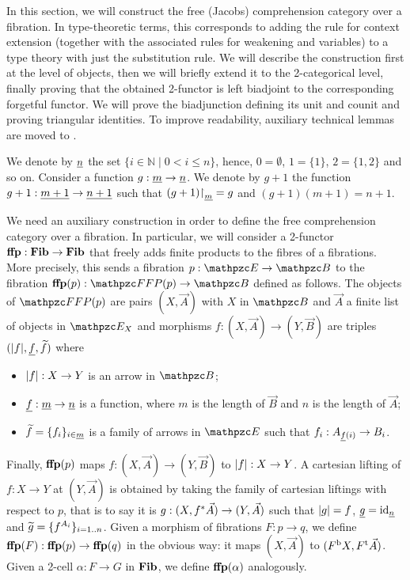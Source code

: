\documentclass{lmcs} %
\theoremstyle{plain}\newtheorem{satz}[thm]{Satz} %
\begin{document}
In this section, we will construct the free (Jacobs) comprehension category over a fibration. In type-theoretic terms, this corresponds to adding the rule for context extension (together with the associated rules for  weakening and variables) to a type theory with just the substitution rule. 
% 
We will describe the construction first at the level of objects, 
then we will briefly extend it to the 2-categorical level, finally proving that the obtained 2-functor is left biadjoint to the corresponding forgetful functor. 
We will prove the biadjunction defining its unit and counit and proving triangular identities.
To improve readability, auxiliary technical lemmas are moved to . 

			\begin{notation}
We denote by $\num{n}$ the set $\{ i \in \mathbb{N} \mid 0 < i \leq n \}$, hence, $\num{0} = \emptyset$, $\num{1} = \{1\}$, $\num{2} = \{1,2\}$ and so on.
				Consider a function $g:\num{m}\to \num{n}$. We denote by $g+1$ the function $g+1:\num{m+1}\to \num{n+1}$ such that $(g+1)\rstn_{\num{m}}=g$ and $(g+1) (m+1)= n+1$.
			\end{notation}

We need an auxiliary construction in order to define the free comprehension category over a fibration. 
In particular, we will consider a 2-functor $\Fp:\Fib\to\Fib$ that freely adds finite products to the fibres of a fibrations. 
%
More precisely, this sends a fibration $p : \ct{E}\to\ct{B}$ to the fibration $\Fp(p) : \FFFP{p} \to \ct{B}$ defined as follows. 
The objects of $\FFFP{p}$ are pairs $(X,\vec{A})$ with $X$ in $\ct{B}$ and $\vec{A}$ a finite list of objects in $\fibre{\ct{E}}{X}$ and 
morphisms $f:(X,\vec{A})\to(Y,\vec{B})$ are triples $(\fp{f},\sp{f},\tp{f})$ 
where 
\begin{itemize} 
	\item $\fp{f}:X\rightarrow Y$ is an arrow in $\ct{B}$;
	\item $\sp{f}:\num{m}\rightarrow \num{n}$ is a function, where $m$ is the length of $\vec{B}$ and $n$ is the length of $\vec{A}$; 
% 
	\item $\tp{f}= \{f_i\}_{i\in \num{m}}$ is a family of arrows in $\ct{E}$ such that $f_i:A_{\sp{f}(i)}\rightarrow B_i$.
\end{itemize} 
Finally, $\Fp(p)$ maps $f:(X,\vec{A})\to(Y,\vec{B})$ to $\fp{f}:X\to Y$.
A cartesian lifting of $f:X\to Y$ at $(Y,\vec{A})$ is obtained by taking the family of cartesian liftings with respect to $p$, that is to say it is $g:(X,\reind{f}\vec{A})\to (Y,\vec{A})$ such that $\fp{g}=f$, $\sp{g}=\id{\num{n}}$ and $\tp{g}=\{\carar{f}{A_i}\}_{i=1..n}$.
Given a morphism of fibrations $F:p\to q$, we define $\Fp(F):\Fp(p)\to\Fp(q)$ in the obvious way: it maps $(X,\vec{A})$ to $(\fb{F}X,\ft{F}\vec{A})$. Given a 2-cell $\alpha:F\to G$ in $\Fib$, we define $\Fp(\alpha)$ analogously.
\end{document}
